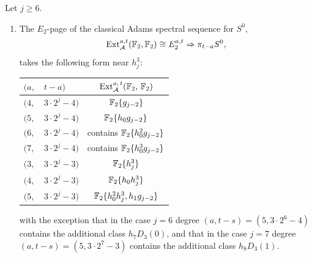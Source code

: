 \begin{thm} \label{E2 descriptions}
  Let $j \geq 6$.
  \begin{enumerate}
  \item The $E_2$-page of the classical Adams spectral sequence for $S^{0}$, 
    $$ \operatorname{\mathrm{Ext}}_{\operatorname{\mathcal{A}}}^{a,t}(\mathbb{F}_2, \mathbb{F}_2) \cong E_2^{a,t} \Rightarrow \pi_{t-a}S^{0},$$
    takes the following form near $h_j^3$:
    \begin{center}{\renewcommand{\arraystretch}{1.2}
        \begin{tabular}{|ll|c|}\hline
          $(a,$ & $t-a)$ & $\operatorname{\mathrm{Ext}}^{a,\,t}_{\operatorname{\mathcal{A}}}(\mathbb{F}_2,\, \mathbb{F}_2)$ \\\hline\hline
          $(4,$ & $ 3 \cdot 2^j-4)$ & $\operatorname{\mathbb{F}}_2\{g_{j-2}\}$ \\\hline
          $(5,$ & $ 3 \cdot 2^j-4)$ & $\operatorname{\mathbb{F}}_2\{h_0g_{j-2}\}$ \\\hline
          $(6,$ & $ 3 \cdot 2^j-4)$ & contains $\operatorname{\mathbb{F}}_2\{h_0^2g_{j-2}\}$ \\\hline
          $(7,$ & $ 3 \cdot 2^j-4)$ & contains $\operatorname{\mathbb{F}}_2\{h_0^3g_{j-2}\}$ \\\hline
          $(3,$ & $ 3 \cdot 2^j-3)$ & $\operatorname{\mathbb{F}}_2\{h_j^3\}$ \\\hline
          $(4,$ & $ 3 \cdot 2^j-3)$ & $\operatorname{\mathbb{F}}_2\{h_0h_j^3\}$ \\\hline
          $(5,$ & $ 3 \cdot 2^j-3)$ & $\operatorname{\mathbb{F}}_2\{h_0^2h_j^3, h_1g_{j-2}\}$ \\\hline    
        \end{tabular}}
    \end{center}
    with the exception that in the case $j=6$ degree $(a,t-s)=(5,3 \cdot 2^{6} - 4)$ contains the additional class $h_7D_3(0)$, and that in the case $j=7$ degree $(a,t-s)=(5,3 \cdot 2^{7} - 3)$ contains the additional class $h_8D_3(1)$.
    

\end{enumerate}
\end{thm}
